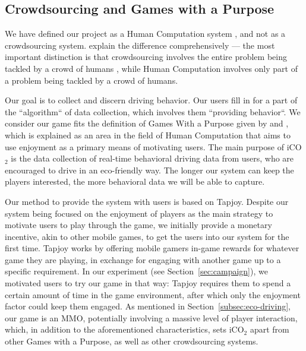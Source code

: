 \documentclass[preprint,authoryear,12pt]{elsarticle}
\begin{document}
\subsection{Crowdsourcing and Games with a Purpose}
\label{subsec:csandgwap}

We have defined our project as a Human Computation system \citep{Yuen.2009,Krause+Smeddinck.2011}, and not as a crowdsourcing system. \cite{Quinn} explain the difference comprehensively --- the most important distinction is that crowdsourcing involves the entire problem being tackled by a crowd of humans \citep{howe2008crowdsourcing}, while Human Computation involves only part of a problem being tackled by a crowd of humans.

Our goal is to collect and discern driving behavior. Our users fill in for a part of the ``algorithm`` of data collection, which involves them ``providing behavior``. 
We consider our game fits the definition of Games With a Purpose given by \cite{Quinn} and \cite{vonAhn2006Games}, which is explained as an area in the field of Human Computation that aims to use enjoyment as a primary means of motivating users. The main purpose of iCO$_2$ is the data collection of real-time behavioral driving data from users, who are encouraged to drive in an eco-friendly way. The longer our system can keep the players interested, the more behavioral data we will be able to capture. 



Our method to provide the system with users is based on Tapjoy. Despite our system being focused on the enjoyment of players as the main strategy to motivate users to play through the game, we initially provide a monetary incentive, akin to other mobile games, to get the users into our system for the first time. Tapjoy works by offering mobile gamers in-game rewards for whatever game they are playing, in exchange for engaging with another game up to a specific requirement. In our experiment (see Section~\ref{sec:campaign}), we motivated users to try our game in that way: Tapjoy requires them to spend a certain amount of time in the game environment, after which only the enjoyment factor could keep them engaged.
As mentioned in Section~\ref{subsec:eco-driving}, our game is an MMO, potentially involving a massive level of player interaction, which, in addition to the aforementioned characteristics, sets iCO$_2$ apart from other Games with a Purpose, as well as other crowdsourcing systems.
\end{document}
